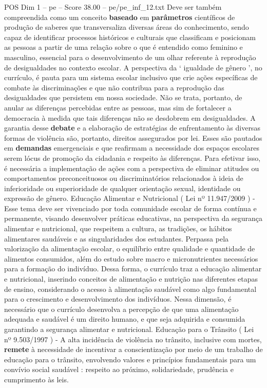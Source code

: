 \begin{textsample}{POS Dim 1 – pe – Score 38.00 – pe/pe\_inf\_12.txt}
Deve ser também compreendida como um conceito \textbf{baseado} em \textbf{parâmetros} científicos de produção de saberes que transversaliza diversas áreas do conhecimento, sendo capaz de identificar processos históricos e culturais que classificam e posicionam as pessoas a partir de uma relação sobre o que é entendido como feminino e masculino, essencial para o desenvolvimento de um olhar referente à reprodução de desigualdades no contexto escolar.
A perspectiva da ‘ igualdade de gênero ’, no currículo, é pauta para um sistema escolar inclusivo que crie ações específicas de combate às discriminações e que não contribua para a reprodução das desigualdades que persistem em nossa sociedade.
Não se trata, portanto, de anular as diferenças percebidas entre as pessoas, mas sim de fortalecer a democracia à medida que tais diferenças não se desdobrem em desigualdades.
A garantia desse \textbf{debate} e a elaboração de estratégias de enfrentamento às diversas formas de violência são, portanto, direitos assegurados por lei.
Esses são pautados em \textbf{demandas} emergenciais e que reafirmam a necessidade dos espaços escolares serem lócus de promoção da cidadania e respeito às diferenças.
Para efetivar isso, é necessária a implementação de ações com a perspectiva de eliminar atitudes ou comportamentos preconceituosos ou discriminatórios relacionados à ideia de inferioridade ou superioridade de qualquer orientação sexual, identidade ou expressão de gênero.
Educação Alimentar e Nutricional ( Lei nº 11.947/2009 ) - Esse tema deve ser vivenciado por toda comunidade escolar de forma contínua e permanente, visando desenvolver práticas educativas, na perspectiva da segurança alimentar e nutricional, que respeitem a cultura, as tradições, os hábitos alimentares saudáveis e as singularidades dos estudantes.
Perpassa pela valorização da alimentação escolar, o equilíbrio entre qualidade e quantidade de alimentos consumidos, além do estudo sobre macro e micronutrientes necessários para a formação do indivíduo.
Dessa forma, o currículo traz a educação alimentar e nutricional, inserindo conceitos de alimentação e nutrição nas diferentes etapas de ensino, considerando o acesso à alimentação saudável como algo fundamental para o crescimento e desenvolvimento dos indivíduos.
Nessa dimensão, é necessário que o currículo desenvolva a percepção de que uma alimentação adequada e saudável é um direito humano, e que seja adquirida e consumida garantindo a segurança alimentar e nutricional.
Educação para o Trânsito ( Lei nº 9.503/1997 ) - A alta incidência de violência no trânsito, inclusive com mortes, \textbf{remete} à necessidade de incentivar a conscientização por meio de um trabalho de educação para o trânsito, envolvendo valores e princípios fundamentais para um convívio social saudável : respeito ao próximo, solidariedade, prudência e cumprimento às leis.

\end{textsample}
